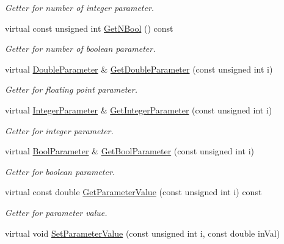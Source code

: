 \begin{DoxyCompactItemize}
\begin{DoxyCompactList}\small\item\em Getter for number of integer parameter. \end{DoxyCompactList}\item 
\hypertarget{class_parameter_list_a5c21a1598d5c0bf2f864f4bb10484313}{virtual const unsigned int \hyperlink{class_parameter_list_a5c21a1598d5c0bf2f864f4bb10484313}{Get\-N\-Bool} () const }\label{class_parameter_list_a5c21a1598d5c0bf2f864f4bb10484313}

\begin{DoxyCompactList}\small\item\em Getter for number of boolean parameter. \end{DoxyCompactList}\item 
virtual \hyperlink{class_double_parameter}{Double\-Parameter} \& \hyperlink{class_parameter_list_a5fd405f70ee9eb625d0ebb1a43e3b126}{Get\-Double\-Parameter} (const unsigned int i)
\begin{DoxyCompactList}\small\item\em Getter for floating point parameter. \end{DoxyCompactList}\item 
virtual \hyperlink{class_integer_parameter}{Integer\-Parameter} \& \hyperlink{class_parameter_list_a4a0f112557a3a9fada4aee97118ff1de}{Get\-Integer\-Parameter} (const unsigned int i)
\begin{DoxyCompactList}\small\item\em Getter for integer parameter. \end{DoxyCompactList}\item 
virtual \hyperlink{class_bool_parameter}{Bool\-Parameter} \& \hyperlink{class_parameter_list_a3982c7d4706e2115eed776e4b08268fb}{Get\-Bool\-Parameter} (const unsigned int i)
\begin{DoxyCompactList}\small\item\em Getter for boolean parameter. \end{DoxyCompactList}\item 
virtual const double \hyperlink{class_parameter_list_a99c664620aa97bc31d1defcf7ab4c927}{Get\-Parameter\-Value} (const unsigned int i) const 
\begin{DoxyCompactList}\small\item\em Getter for parameter value. \end{DoxyCompactList}\item 
virtual void \hyperlink{class_parameter_list_ad88a26efd71e1d3d65924500b72ffd61}{Set\-Parameter\-Value} (const unsigned int i, const double in\-Val)

\end{DoxyCompactItemize}
